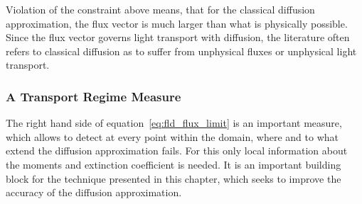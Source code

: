 Violation of the constraint above means, that for the classical diffusion approximation, the flux vector is much larger than what is physically possible. Since the flux vector governs light transport with diffusion, the literature often refers to classical diffusion as to suffer from unphysical fluxes or unphysical light transport.


\subsubsection*{A Transport Regime Measure}

The right hand side of equation~\ref{eq:fld_flux_limit} is an important measure, which allows to detect at every point within the domain, where and to what extend the diffusion approximation fails. For this only local information about the moments and extinction coefficient is needed. It is an important building block for the technique presented in this chapter, which seeks to improve the accuracy of the diffusion approximation.

